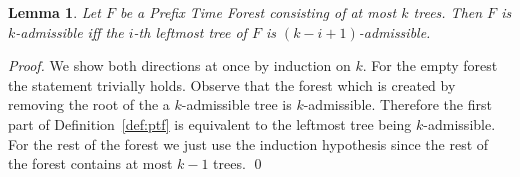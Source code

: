 \documentclass{llncs}
\newtheorem{lemma}[definition]{Lemma}
\begin{document}
\begin{lemma}
\label{lm:k-admissibility}
Let $F$ be a Prefix Time Forest consisting of at most $k$ trees.
Then $F$ is $k$-admissible iff the $i$-th leftmost tree of $F$ is $(k - i + 1)$-admissible.
\end{lemma}
\begin{proof}
We show both directions at once by induction on $k$.
For the empty forest the statement trivially holds.
Observe that the forest which is created by removing the root of the a $k$-admissible tree is $k$-admissible.
Therefore the first part of Definition~\ref{def:ptf} is equivalent to the leftmost tree being $k$-admissible.
For the rest of the forest we just use the induction hypothesis since the rest of the forest contains at most $k - 1$ trees.
\qed
\end{proof}
\end{document}
